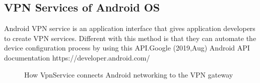 \vspace{12pt}


\subsection{VPN Services  of Android OS}
Android VPN service is an application interface that gives application developers to create VPN services. Different with this method is that they can automate the device configuration process by using this API.Google (2019,Aug) Android API documentation https://developer.android.com/ \cite{VPNAndroid}







\vspace{12pt}

\begin{figure}[H]
    \centering
    \caption{How VpnService connects Android networking to the VPN gateway}
    \label{fig:timeline}
\end{figure}

\vspace{12pt}

